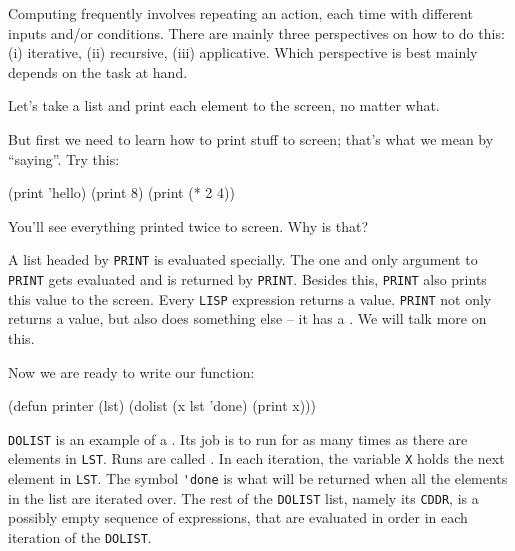 \documentclass[a4paper,11pt]{article}
\begin{document}
\begin{uenum}
\item Computing frequently involves repeating an action, each time with different inputs and/or conditions. There are mainly three perspectives on how to do this: (i) iterative, (ii) recursive, (iii) applicative. Which perspective is best mainly depends on the task at hand.

\item Let's take a list and print each element to the screen, no matter what. 

\item But first we need to learn how to print stuff to screen; that's what we mean by ``saying''. Try this: 

\begin{lispcode}
(print 'hello)
(print 8)
(print (* 2 4))
\end{lispcode}

\begin{uenumi}

\item You'll see everything printed twice to screen. Why is that?

\item A list headed by \Verb+PRINT+ is evaluated specially. The one and only argument to \Verb+PRINT+ gets evaluated and is returned by \Verb+PRINT+. Besides this, \Verb+PRINT+ also prints this value to the screen. Every \Verb+LISP+ expression returns a value. \Verb+PRINT+ not only returns a value, but also does something else -- it has a . We will talk more on this. 
\end{uenumi}

\item Now we are ready to write our function:

\begin{lispcode}
(defun printer (lst)
  (dolist (x lst 'done)
	(print x)))
\end{lispcode}

\item \Verb+DOLIST+ is an example of a . Its job is to run for as many times as there are elements in \Verb+LST+. Runs are called . In each iteration, the variable \Verb+X+ holds the next element in \Verb+LST+. The symbol \Verb+'done+ is what will be returned when all the elements in the list are iterated over. The rest of the \Verb+DOLIST+ list, namely its \Verb+CDDR+, is a possibly empty sequence of expressions, that are evaluated in order in each iteration of the \Verb+DOLIST+.


\end{uenum}
\end{document}
